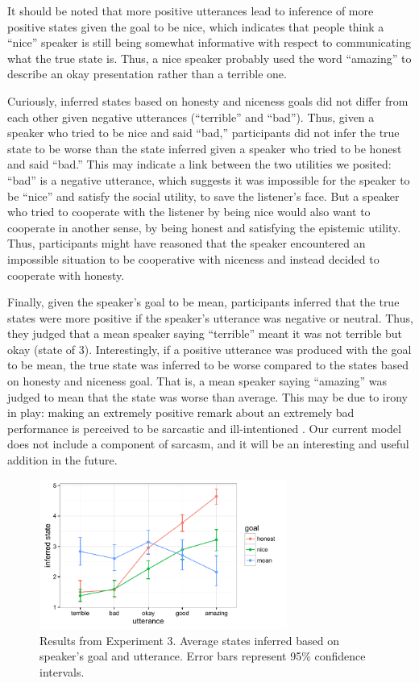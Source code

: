 \documentclass[10pt,letterpaper]{article}
\begin{document}
It should be noted that more positive utterances lead to inference of more positive states given the goal to be nice, which indicates that people think a ``nice'' speaker is still being somewhat informative with respect to communicating what the true state is. Thus, a nice speaker probably used the word ``amazing'' to describe an okay presentation rather than a terrible one.

Curiously, inferred states based on honesty and niceness goals did not differ from each other given negative utterances (``terrible'' and ``bad''). Thus, given a speaker who tried to be nice and said ``bad,'' participants did not infer the true state to be worse than the state inferred given a speaker who tried to be honest and said ``bad.'' This may indicate a link between the two utilities we posited: ``bad'' is a negative utterance, which suggests it was impossible for the speaker to be ``nice'' and satisfy the social utility, to save the listener's face. But a speaker who tried to cooperate with the listener by being nice would also want to cooperate in another sense, by being honest and satisfying the epistemic utility.  Thus, participants might have reasoned that the speaker encountered an impossible situation to be cooperative with niceness and instead decided to cooperate with honesty. 

Finally, given the speaker's goal to be mean, participants inferred that the true states were more positive if the speaker's utterance was negative or neutral. Thus, they judged that a mean speaker saying ``terrible'' meant it was not terrible but okay (state of 3). Interestingly, if a positive utterance was produced with the goal to be mean, the true state was inferred to be worse compared to the states based on honesty and niceness goal. That is, a mean speaker saying ``amazing'' was judged to mean that the state was worse than average. This may be due to irony in play: making an extremely positive remark about an extremely bad performance is perceived to be sarcastic and ill-intentioned \cite{colston1997}. Our current model does not include a component of sarcasm, and it will be an interesting and useful addition in the future.

\begin{figure}
\begin{centering} 
\includegraphics[width=3.2in]{figures/exp3.pdf}
\caption{\label{fig:exp3} Results from Experiment 3. Average states inferred based on speaker's goal and utterance. Error bars represent 95\% confidence intervals.}
\end{centering} 
\end{figure}
\end{document}
